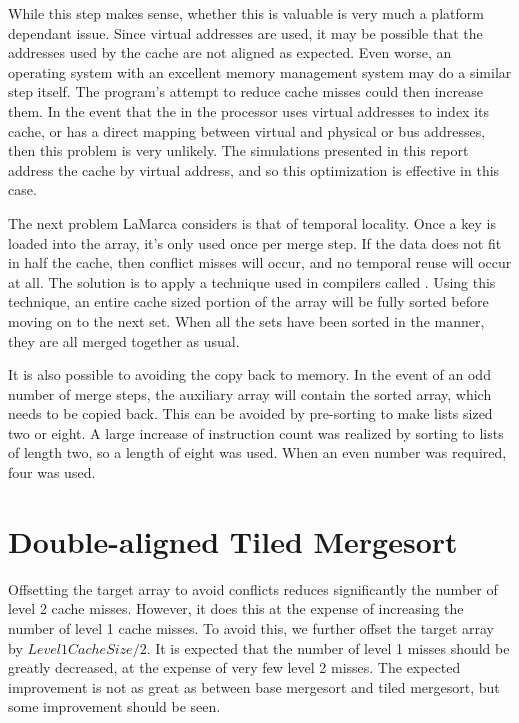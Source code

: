 While this step makes sense, whether this is valuable is very much a platform
dependant issue. Since virtual addresses are used, it may be possible that the
addresses used by the cache are not aligned as expected. Even worse, an
operating system with an excellent memory management system may do a similar
step itself. The program's attempt to reduce cache misses could then increase
them. In the event that the  in the processor uses
virtual addresses to index its cache, or has a direct mapping between virtual
and physical or bus addresses, then this problem is very unlikely. The
simulations presented in this report address the cache by virtual address, and
so this optimization is effective in this case.

The next problem LaMarca considers is that of temporal locality. Once a key is
loaded into the array, it's only used once per merge step. If the data does not
fit in half the cache, then conflict misses will occur, and no temporal reuse
will occur at all. The solution is to apply a technique used in compilers called
. Using this technique, an entire cache sized portion of the array
will be fully sorted before moving on to the next set. When all the sets have
been sorted in the manner, they are all merged together as usual.

It is also possible to avoiding the copy back to memory. In the event of an odd
number of merge steps, the auxiliary array will contain the sorted array, which
needs to be copied back. This can be avoided by pre-sorting to make lists sized
two or eight. A large increase of instruction count was realized by sorting to
lists of length two, so a length of eight was used. When an even number was
required, four was used.

\section{Double-aligned Tiled Mergesort}
\label{double-aligned tiled mergesort}
Offsetting the target array to avoid conflicts reduces significantly the number
of level 2 cache misses. However, it does this at the expense of increasing the
number of level 1 cache misses. To avoid this, we further offset the target
array by $Level1CacheSize/2$. It is expected that the number of level 1 misses
should be greatly decreased, at the expense of very few level 2 misses. The
expected improvement is not as great as between base mergesort and tiled
mergesort, but some improvement should be seen.

